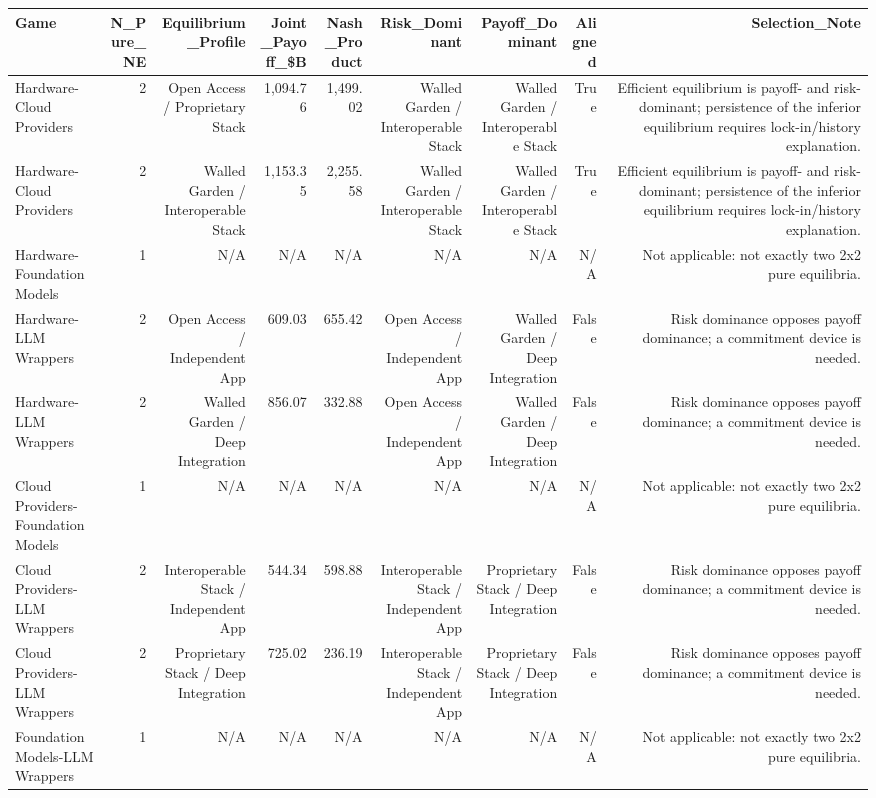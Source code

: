 

\begin{tabular}{@{}lrrrrrrrr@{}}
\toprule
Game & N\_Pure\_NE & Equilibrium\_Profile & Joint\_Payoff\_\$B & Nash\_Product & Risk\_Dominant & Payoff\_Dominant & Aligned & Selection\_Note \\
\midrule
Hardware-Cloud Providers & 2 & Open Access / Proprietary Stack & 1,094.76 & 1,499.02 & Walled Garden / Interoperable Stack & Walled Garden / Interoperable Stack & True & Efficient equilibrium is payoff- and risk-dominant; persistence of the inferior equilibrium requires lock-in/history explanation. \\
Hardware-Cloud Providers & 2 & Walled Garden / Interoperable Stack & 1,153.35 & 2,255.58 & Walled Garden / Interoperable Stack & Walled Garden / Interoperable Stack & True & Efficient equilibrium is payoff- and risk-dominant; persistence of the inferior equilibrium requires lock-in/history explanation. \\
Hardware-Foundation Models & 1 & N/A & N/A & N/A & N/A & N/A & N/A & Not applicable: not exactly two 2x2 pure equilibria. \\
Hardware-LLM Wrappers & 2 & Open Access / Independent App & 609.03 & 655.42 & Open Access / Independent App & Walled Garden / Deep Integration & False & Risk dominance opposes payoff dominance; a commitment device is needed. \\
Hardware-LLM Wrappers & 2 & Walled Garden / Deep Integration & 856.07 & 332.88 & Open Access / Independent App & Walled Garden / Deep Integration & False & Risk dominance opposes payoff dominance; a commitment device is needed. \\
Cloud Providers-Foundation Models & 1 & N/A & N/A & N/A & N/A & N/A & N/A & Not applicable: not exactly two 2x2 pure equilibria. \\
Cloud Providers-LLM Wrappers & 2 & Interoperable Stack / Independent App & 544.34 & 598.88 & Interoperable Stack / Independent App & Proprietary Stack / Deep Integration & False & Risk dominance opposes payoff dominance; a commitment device is needed. \\
Cloud Providers-LLM Wrappers & 2 & Proprietary Stack / Deep Integration & 725.02 & 236.19 & Interoperable Stack / Independent App & Proprietary Stack / Deep Integration & False & Risk dominance opposes payoff dominance; a commitment device is needed. \\
Foundation Models-LLM Wrappers & 1 & N/A & N/A & N/A & N/A & N/A & N/A & Not applicable: not exactly two 2x2 pure equilibria. \\
\bottomrule
\end{tabular}